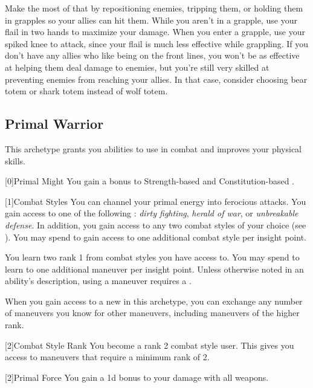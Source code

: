             Make the most of that by repositioning enemies, tripping them, or holding them in grapples so your allies can hit them.
            While you aren't in a grapple, use your flail in two hands to maximize your damage.
            When you enter a grapple, use your spiked knee to attack, since your flail is much less effective while grappling.
            If you don't have any allies who like being on the front lines, you won't be as effective at helping them deal damage to enemies, but you're still very skilled at preventing enemies from reaching your allies.
            In that case, consider choosing bear totem or shark totem instead of wolf totem.

    \newpage
    \subsection{Primal Warrior}
        This archetype grants you abilities to use in combat and improves your physical skills.

        [0]{Primal Might} You gain a  bonus to Strength-based  and Constitution-based .

        {
            [1]{Combat Styles}
            You can channel your primal energy into ferocious attacks.
            You gain access to one of the following : \textit{dirty fighting}, \textit{herald of war}, or \textit{unbreakable defense}.
            In addition, you gain access to any two combat styles of your choice (see ).
            You may spend  to gain access to one additional combat style per insight point.

            You learn two rank 1  from combat styles you have access to.
            You may spend  to learn to one additional maneuver per insight point.
            Unless otherwise noted in an ability's description, using a maneuver requires a .

            When you gain access to a new  in this archetype,
                you can exchange any number of maneuvers you know for other maneuvers,
                including maneuvers of the higher rank.
        }

        {
            [2]{Combat Style Rank} You become a rank 2 combat style user.
            This gives you access to maneuvers that require a minimum rank of 2.

            [2]{Primal Force} You gain a \plus1d bonus to your damage with all weapons.
        }

